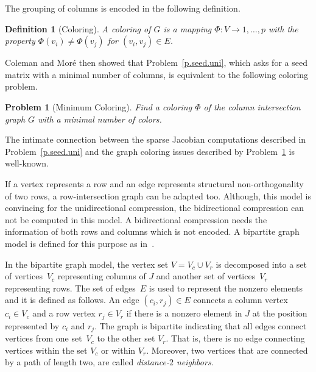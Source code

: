 \documentclass[12pt, oneside]{book}
\newtheorem{problem}{Problem}
\newtheorem{definition}{Definition}
\begin{document}
The grouping of columns is encoded in the following definition.
%
\begin{definition}[Coloring]
A coloring of $G$ is a mapping $\Phi : V \to {1, \dots, p}$ with the property
$\Phi(v_i)\neq \Phi(v_j)$ for $(v_i,v_j) \in E$.
\end{definition}
%
Coleman and Mor\'{e} \cite{Coleman1983EoS} then showed that Problem~\ref{p.seed.uni}, which
asks for a seed matrix with a minimal number of columns, is equivalent to the following
coloring problem.
%
\begin{problem}[Minimum Coloring]
\label{p:mincol}
%
Find a coloring $\Phi$ of the column intersection graph $G$ with a minimal number of
colors.
\end{problem}

The intimate connection between the sparse Jacobian computations described in
Problem~\ref{p.seed.uni} and the graph coloring issues described by Problem~\ref{p:mincol} is
well-known.

If a vertex represents a row and an edge represents structural
non-orthogonality of two rows, a row-intersection graph can be adapted too.
Although, this model is convincing for the unidirectional compression, 
the bidirectional compression can not be computed in this model.
A bidirectional compression needs the information of both rows and columns which
is not encoded. A bipartite graph model is defined for this 
purpose as in~\cite{Coleman1996SaE,cv:ecs,hs:csj}. 

In the bipartite graph model, the vertex set $V=V_c\cup V_r$
is decomposed into a set of vertices~$V_c$ representing columns of $J$ and another set of
vertices~$V_r$ representing rows. The set of edges~$E$ is used to represent the nonzero
elements and it is defined as follows. An edge $(c_i , r_j) \in E$ connects a column
vertex $c_i \in V_c$ and a row vertex $r_j \in V_r$ if there is a nonzero element in $J$
at the position represented by $c_i$ and $r_j$. The graph is bipartite indicating that
all edges connect vertices from one set~$V_c$ to the other set $V_r$. That is, there is
no edge connecting vertices within the set $V_c$ or within $V_r$. Moreover, two vertices
that are connected by a path of length two, are called \emph{distance-$2$ neighbors}.
\end{document}
